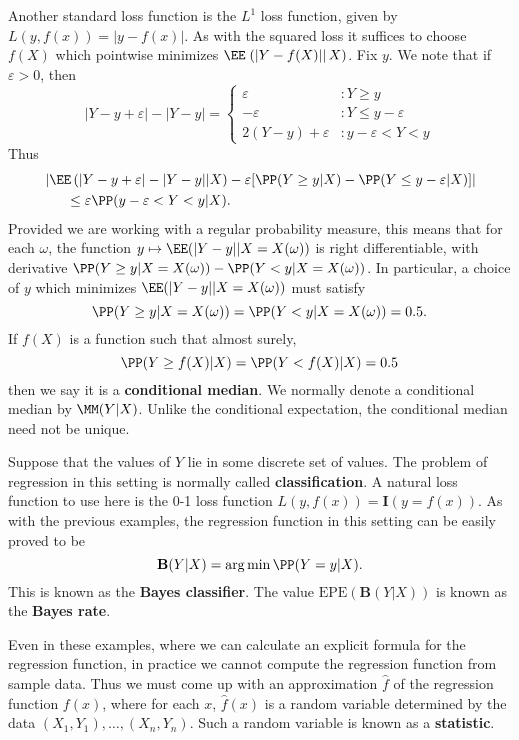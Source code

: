 \begin{example}
	Another standard loss function is the $L^1$ loss function, given by $L(y,f(x)) = |y - f(x)|$. As with the squared loss it suffices to choose $f(X)$ which pointwise minimizes $\EE\left. \left( |Y - f(X)| \right| X \right)$. Fix $y$. We note that if $\varepsilon > 0$, then
	\[ |Y - y + \varepsilon| - |Y - y| = \begin{cases} \varepsilon &: Y \geq y\\ -\varepsilon &: Y \leq y - \varepsilon \\
	2(Y - y) + \varepsilon &: y - \varepsilon < Y < y \end{cases} \]
	Thus
	\begin{align*}
		&\left| \EE \left( |Y - y + \varepsilon| - |Y - y| | X \right) - \varepsilon [\PP(Y \geq y | X) - \PP(Y \leq y - \varepsilon | X) ] \right|\\
		&\ \ \ \ \ \leq \varepsilon \PP(y - \varepsilon < Y < y | X).
	\end{align*}
	Provided we are working with a regular probability measure, this means that for each $\omega$, the function $y \mapsto \EE(|Y - y| | X = X(\omega))$ is right differentiable, with derivative $\PP(Y \geq y | X = X(\omega)) - \PP(Y < y | X = X(\omega))$. In particular, a choice of $y$ which minimizes $\EE(|Y - y| | X = X(\omega))$ must satisfy
	\[ \PP(Y \geq y | X = X(\omega)) = \PP(Y < y | X = X(\omega)) = 0.5. \]
	If $f(X)$ is a function such that almost surely,
	\[ \PP(Y \geq f(X) | X) = \PP(Y < f(X) | X) = 0.5 \]
	then we say it is a {\bf conditional median}. We normally denote a conditional median by $\MM(Y | X)$. Unlike the conditional expectation, the conditional median need not be unique.
\end{example}

\begin{example}
	Suppose that the values of $Y$ lie in some discrete set of values. The problem of regression in this setting is normally called {\bf classification}. A natural loss function to use here is the 0-1 loss function $L(y,f(x)) = \mathbf{I}(y = f(x))$. As with the previous examples, the regression function in this setting can be easily proved to be
	\[ \mathbf{B}(Y|X) = \argmin \PP(Y = y | X). \]
	This is known as the {\bf Bayes classifier}. The value $\text{EPE}(\mathbf{B}(Y|X))$ is known as the {\bf Bayes rate}.
\end{example}

Even in these examples, where we can calculate an explicit formula for the regression function, in practice we cannot compute the regression function from sample data. Thus we must come up with an approximation $\hat{f}$ of the regression function $f(x)$, where for each $x$, $\hat{f}(x)$ is a random variable determined by the data $(X_1,Y_1), \dots, (X_n,Y_n)$. Such a random variable is known as a {\bf statistic}.

